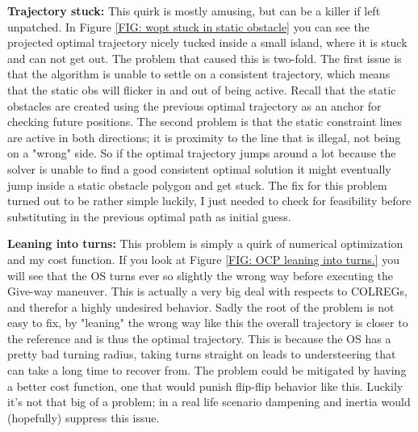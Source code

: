 \textbf{Trajectory stuck:}\newline
This quirk is mostly amusing, but can be a killer if left unpatched. In Figure \ref{FIG: wopt stuck in static obstacle} you can
see the projected optimal trajectory nicely tucked inside a small island, where it is stuck and can not get out. The problem that caused
this is two-fold. The first issue is that the algorithm is unable to settle on a consistent trajectory, which means that the static obs
will flicker in and out of being active. Recall that the static obstacles are created using the previous optimal trajectory as an
anchor for checking future positions. The second problem is that the static constraint lines are active in both directions; it is proximity
to the line that is illegal, not being on a "wrong" side. So if the optimal trajectory jumps around a lot because the solver is unable
to find a good consistent optimal solution it might eventually jump inside a static obstacle polygon and get stuck. The fix for this
problem turned out to be rather simple luckily, I just needed to check for feasibility before substituting in the previous
optimal path as initial guess.

\textbf{Leaning into turns:}\newline
This problem is simply a quirk of numerical optimization and my cost function. If you look at Figure \ref{FIG: OCP leaning into turns.}
you will see that the OS turns ever so slightly the wrong way before executing the Give-way maneuver. This is actually a very big deal with
respects to COLREGs, and therefor a highly undesired behavior. Sadly the root of the problem is not easy to fix, by "leaning" the wrong way
like this the overall trajectory is closer to the reference and is thus the optimal trajectory. This is because the OS has a pretty
bad turning radius, taking turns straight on leads to understeering that can take a long time to recover from. The problem could
be mitigated by having a better cost function, one that would punish flip-flip behavior like this. Luckily it's not that big of a problem; 
in a real life scenario dampening and inertia would (hopefully) suppress this issue.


